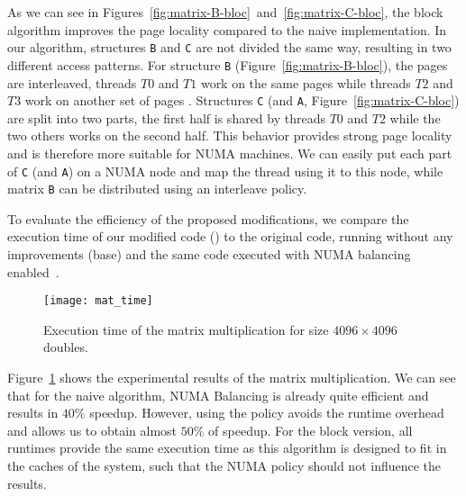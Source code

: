 
As we can see in Figures~\ref{fig:matrix-B-bloc}~and~\ref{fig:matrix-C-bloc}, the block algorithm improves the page
locality compared to the naive implementation. In our algorithm, structures \texttt{B}
and \texttt{C} are not divided the same way, resulting in two different access patterns. For structure \texttt{B} (Figure~\ref{fig:matrix-B-bloc}), the pages
are interleaved, threads $T0$ and $T1$ work on the same pages while threads
$T2$ and $T3$ work on another set of pages . Structures \texttt{C} (and
\texttt{A}, Figure~\ref{fig:matrix-C-bloc}) are split into two parts, the first half
is shared by threads $T0$ and $T2$ while the two others works on the second
half. This behavior provides strong page locality and is therefore more
suitable for NUMA machines. We can easily put each part of \texttt{C} (and
\texttt{A}) on a NUMA node and map the thread using it to this node, while matrix
\texttt{B} can be distributed using an interleave policy.

To evaluate the efficiency of the proposed modifications, we compare the execution
time of our modified code (\TABARNAC) to the original code, running without any
improvements (base) and the same code executed with NUMA balancing enabled~\cite{Corbet}.

\begin{figure}[!t]
    \centering
    \texttt{[image: mat\_time]}
    \caption{Execution time of the matrix multiplication for size $4096\times 4096$ doubles.}
    \label{fig:matrix-res}
\end{figure}

Figure~\ref{fig:matrix-res} shows the experimental results of the matrix multiplication. We can see that for
the naive algorithm, NUMA Balancing is already quite efficient and results in $40\%$
speedup. However, using the \TABARNAC policy avoids the runtime overhead and
allows us to obtain almost $50\%$ of speedup. For the block version, all runtimes
provide the same execution time as this algorithm is designed to fit in the
caches of the system, such that the NUMA policy should not influence the results.

